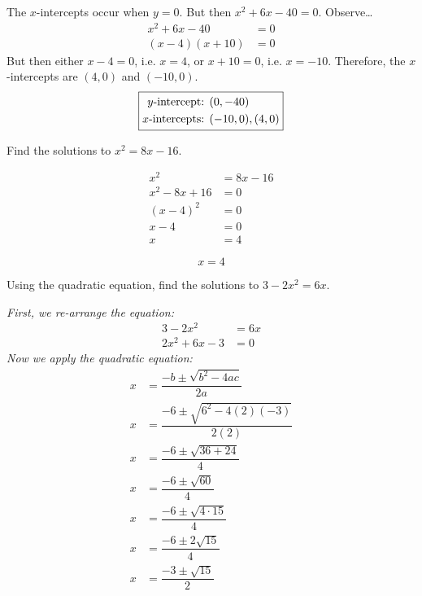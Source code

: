 \documentclass[12pt,letterpaper]{exam}
\begin{document}
\begin{questions}
{The $x$-intercepts occur when $y= 0$. But then $x^2 + 6x - 40= 0$. Observe\dots
	\[
	\begin{aligned}
	x^2 + 6x - 40&= 0 \\
	(x - 4)(x + 10)&= 0
	\end{aligned}
	\]
But then either $x - 4= 0$, i.e. $x= 4$, or $x + 10= 0$, i.e. $x= -10$. Therefore, the $x$-intercepts are $(4, 0)$ and $(-10, 0)$. \pvspace{1cm}
	\[
	\boxed{%
	\begin{aligned}
	y\text{-intercept: }& (0, -40) \\
	x\text{-intercepts: }& (-10, 0), (4, 0)
	\end{aligned}
	}
	\]
}





\newpage
\question[5] Find the solutions to $x^2= 8x - 16$. \pspace

	\[
	\begin{aligned}
	x^2&= 8x - 16 \\[0.3cm]
	x^2 - 8x + 16&= 0 \\[0.3cm]
	(x - 4)^2&= 0 \\[0.3cm]
	x - 4&= 0 \\[0.3cm]
	x&= 4
	\end{aligned}
	\] \pspace
	
	\[
	\boxed{x= 4}
	\]





\newpage
\question[5] Using the quadratic equation, find the solutions to $3 - 2x^2= 6x$. \pspace

{\itshape First, we re-arrange the equation:
	\[
	\begin{aligned}
	3 - 2x^2&= 6x \\
	2x^2 + 6x - 3&= 0 
	\end{aligned}
	\]
Now we apply the quadratic equation:
	\[
	\begin{aligned}
	x&= \dfrac{-b \pm \sqrt{b^2 - 4ac}}{2a} \\[0.3cm]
	x&= \dfrac{-6 \pm \sqrt{6^2 - 4(2)(-3)}}{2(2)} \\[0.3cm]
	x&= \dfrac{-6 \pm \sqrt{36 + 24}}{4} \\[0.3cm]
	x&= \dfrac{-6 \pm \sqrt{60}}{4} \\[0.3cm]
	x&= \dfrac{-6 \pm \sqrt{4 \cdot 15}}{4} \\[0.3cm]
	x&= \dfrac{-6 \pm 2\sqrt{15}}{4} \\[0.3cm]
	x&= \dfrac{-3 \pm \sqrt{15}}{2}
	\end{aligned}
	\] \pspace
	
}
\end{questions}
\end{document}
